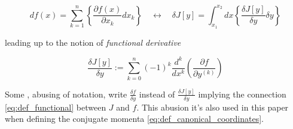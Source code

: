 \begin{equation*}
  df(x) = \sum_{k=1}^{n}
  \left\{ \frac{\partial f(x)}{\partial x_k} dx_k \right\}
  \quad \longleftrightarrow \quad
  \delta J[y] = \int_{x_1}^{x_2} dx
  \left\{ \frac{\delta J[y]}{\delta y} \delta y \right\}
\end{equation*}

leading up to the notion of \emph{functional derivative}

\begin{equation} \label{eq:functional_derivative}
  \frac{\delta J[y]}{\delta y} := \sum_{k = 0}^{n} (-1)^k \frac{d^k}{dx^k}
  \left( \frac{\partial f}{\partial y^{(k)}}\right)
\end{equation}

Some \cite{Chen13}, abusing of notation,  write $\frac{\delta f}{\delta y}$
instead of $\frac{\delta J[y]}{\delta y}$ implying the connection
\eqref{eq:def_functional} between $J$ and $f$. This abusion it's also used in
this paper when defining the conjugate momenta
\eqref{eq:def_canonical_coordinates}.
